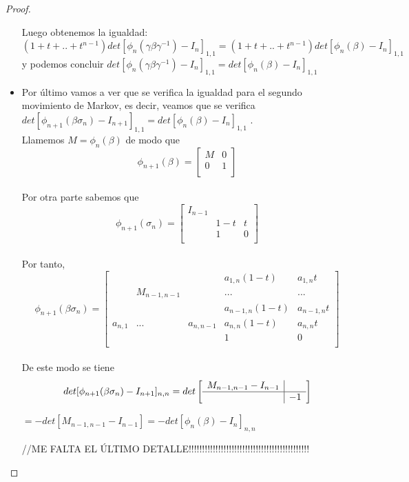 \documentclass[14pt]{extarticle}
\begin{document}
\begin{proof}
\begin{itemize}
	 Luego obtenemos la igualdad:\\
	  $ (1+t+..+ t^{n-1} ) det[ \phi_{n}(\gamma\beta\gamma^{-1}) - I_{n}] _{1,1} = (1+t+..+ t^{n-1} ) det[ \phi_{n}(\beta) - I_{n}] _{1,1} $\\
	  
	  y podemos concluir
	  $ det[ \phi_{n}(\gamma\beta\gamma^{-1}) - I_{n}] _{1,1} = det[ \phi_{n}(\beta) - I_{n}] _{1,1} $\\
	  
	  \item 
	  Por último vamos a ver que se verifica la igualdad para el segundo movimiento de Markov, es decir, veamos que se verifica $ det[\phi_{n+1}(\beta\sigma_{n}) - I_{n+1}]_{1,1} = det[\phi_{n}(\beta) - I_{n}]_{1,1}$ .\\
	  
	  Llamemos $ M = \phi_{n}(\beta) $ de modo que 
 	 \[ \phi_{n+1}(\beta) = \left[\begin{array}{r|r}
 	  M & 0 \\ \hline	
 	  0 & 1\\
 	 \end{array}\right]\]\\	  
 	 
 	 Por otra parte sabemos que 
 	 \[ \phi_{n+1} (\sigma_{n}) = \begin{bmatrix}
 	 I_{n-1} &  &  \\
 	 & 1-t & t  \\
 	 & 1 & 0  \\
 	 \end{bmatrix}\]\\
 	 
 	 Por tanto, 
 	 \[ \phi_{n+1} (\beta\sigma_{n}) = \begin{bmatrix}
 	 & & & a_{1,n}(1-t) & a_{1,n}t\\
 	 & M_{n-1,n-1} & & ... & ...\\
 	 & & & a_{n-1,n}(1-t) & a_{n-1,n}t\\
 	 a_{n,1}& ... & a_{n,n-1} & a_{n,n}(1-t) & a_{n,n}t\\
 	 & & & 1 & 0\\
 	 \end{bmatrix}\]\\
	  
	 De este modo se tiene 
 	 \[det[\phi_{n+1}(\beta\sigma_{n}) - I_{n+1}]_{n,n} = det \left[\begin{array}{r|r}
    	M_{n-1,n-1} - I_{n-1} & \\ \hline	
 	    & -1\\
 	 \end{array}\right]\] 
 	 \begin{center}
 	 	$ = -det[M_{n-1,n-1}-I_{n-1}] = -det[\phi_{n}(\beta)-I_{n}]_{n,n} $ 
 	 \end{center} 
	  //ME FALTA EL ÚLTIMO DETALLE!!!!!!!!!!!!!!!!!!!!!!!!!!!!!!!!!!!!!!!!!!!!!
      \end{itemize}
 \end{proof}
\end{document}
